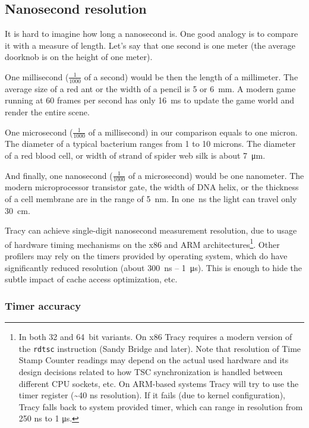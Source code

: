 \documentclass[hidelinks,titlepage,a4paper]{article}
\begin{document}
\subsection{Nanosecond resolution}

It is hard to imagine how long a nanosecond is. One good analogy is to compare it with a measure of length. Let's say that one second is one meter (the average doorknob is on the height of one meter).

One millisecond ($\frac{1}{1000}$ of a second) would be then the length of a millimeter. The average size of a red ant or the width of a pencil is 5 or 6~\si{\milli\metre}. A modern game running at 60 frames per second has only 16~\si{\milli\second} to update the game world and render the entire scene.

One microsecond ($\frac{1}{1000}$ of a millisecond) in our comparison equals to one micron. The diameter of a typical bacterium ranges from 1 to 10 microns. The diameter of a red blood cell, or width of strand of spider web silk is about 7~\si{\micro\metre}.

And finally, one nanosecond ($\frac{1}{1000}$ of a microsecond) would be one nanometer. The modern microprocessor transistor gate, the width of DNA helix, or the thickness of a cell membrane are in the range of 5~\si{\nano\metre}. In one~\si{\nano\second} the light can travel only 30~\si{\centi\meter}.

Tracy can achieve single-digit nanosecond measurement resolution, due to usage of hardware timing mechanisms on the x86 and ARM architectures\footnote{In both 32 and 64~bit variants. On x86 Tracy requires a modern version of the \texttt{rdtsc} instruction (Sandy Bridge and later). Note that resolution of Time Stamp Counter readings may depend on the actual used hardware and its design decisions related to how TSC synchronization is handled between different CPU sockets, etc. On ARM-based systems Tracy will try to use the timer register (\textasciitilde 40 \si{\nano\second} resolution). If it fails (due to kernel configuration), Tracy falls back to system provided timer, which can range in resolution from 250 \si{\nano\second} to 1 \si{\micro\second}.}. Other profilers may rely on the timers provided by operating system, which do have significantly reduced resolution (about 300~\si{\nano\second} -- 1~\si{\micro\second}). This is enough to hide the subtle impact of cache access optimization, etc.

\subsubsection{Timer accuracy}
\end{document}
